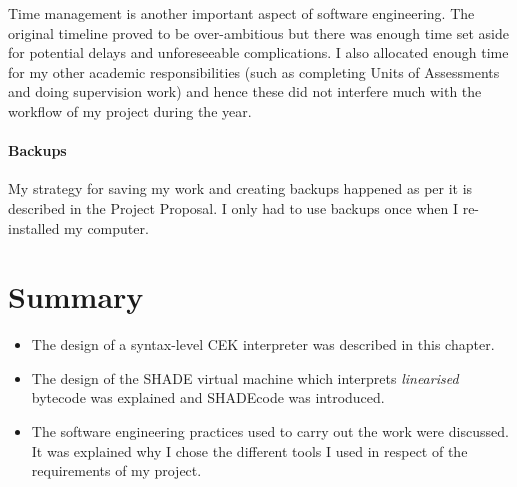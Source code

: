 \documentclass[class=article, crop=false]{standalone}
\begin{document}
Time management is another important aspect of software engineering. The original
timeline proved to be over-ambitious but there was enough time set aside for
potential delays and unforeseeable complications. I also allocated enough time
for my other academic responsibilities (such as completing Units of Assessments
and doing supervision work) and hence these did not interfere much with the
workflow of my project during the year.

\paragraph{Backups}

My strategy for saving my work and creating backups happened as per it is
described in the Project Proposal. I only had to use backups once when I
re-installed my computer.

\section{Summary}
\begin{itemize}
\item The design of a syntax-level CEK interpreter was described in this chapter.
\item The design of the SHADE virtual machine which interprets \emph{linearised}
bytecode was explained and SHADEcode was introduced.
\item The software engineering practices used to carry out the work were discussed.
It was explained why I chose the different tools I used in respect of the
requirements of my project.
\end{itemize}
\end{document}
